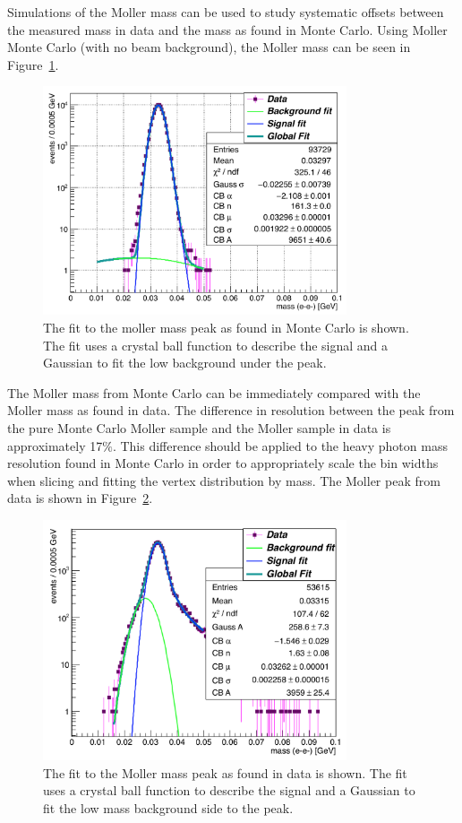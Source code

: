 Simulations of the Moller mass can be used to study systematic offsets between the measured mass in data and the mass as found in Monte Carlo. Using Moller Monte Carlo (with no beam background), the Moller mass can be seen in Figure~\ref{fig:mollerMC_L1L1}. 

\begin{figure}[H]
  \centering
     \includegraphics[width=0.8\textwidth]{plots/mollerMassMC.png}
  \caption{The fit to the moller mass peak as found in Monte Carlo is shown. The fit uses a crystal ball function to describe the signal and a Gaussian to fit the low background under the peak.}
  \label{fig:mollerMC_L1L1}
\end{figure}

The Moller mass from Monte Carlo can be immediately compared with the Moller mass as found in data. The difference in resolution between the peak from the pure Monte Carlo Moller sample and the Moller sample in data is approximately 17$\%$. This difference should be applied to the heavy photon mass resolution found in Monte Carlo in order to appropriately scale the bin widths when slicing and fitting the vertex distribution by mass. The Moller peak from data is shown in Figure~\ref{fig:moller_L1L1}. 

\begin{figure}[H]
  \centering
     \includegraphics[width=0.8\textwidth]{plots/mollerMass.png}
  \caption{The fit to the Moller mass peak as found in data is shown. The fit uses a crystal ball function to describe the signal and a Gaussian to fit the low mass background side to the peak.}
  \label{fig:moller_L1L1}
\end{figure} 


